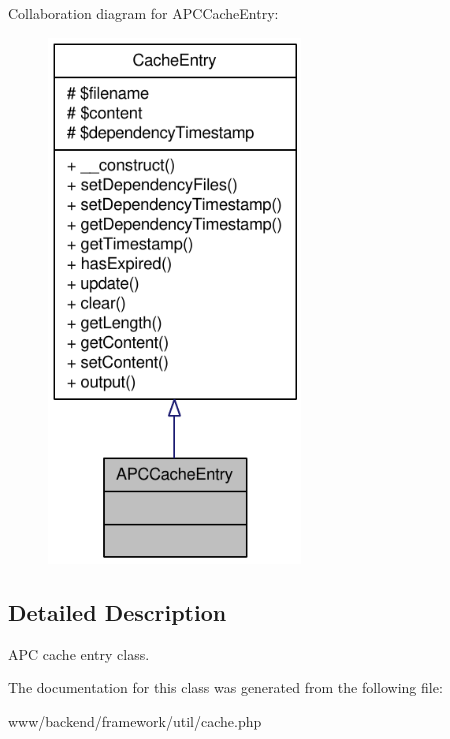 Collaboration diagram for APCCacheEntry:\nopagebreak
\begin{figure}[H]
\begin{center}
\leavevmode
\includegraphics[width=190pt]{classAPCCacheEntry__coll__graph}
\end{center}
\end{figure}


\subsection{Detailed Description}
APC cache entry class. 

The documentation for this class was generated from the following file:\begin{DoxyCompactItemize}
\item 
www/backend/framework/util/cache.php\end{DoxyCompactItemize}
